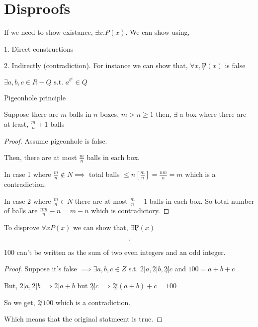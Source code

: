 \section*{Disproofs}

If we need to show existance, $\exists x. P(x)$. We can show using, 

1. Direct constructions

2. Indirectly (contradiction). For instance we can show that, $\forall x, \not P(x)$ is false


\begin{eg}
    $\exists a,b,c \in R - Q \text{ s.t. } a^b^c \in Q$
\end{eg}

\begin{eg}
    Pigeonhole principle

    Suppose there are $m$ balls in $n$ boxes, $m > n \geq 1$ then, $\exists$ a box where there are at least, $\frac{m}{n} + 1$ balls 
\end{eg}

\begin{proof}
    Assume pigeonhole is false.

    Then, there are at most $\frac{m}{n}$ balls in each box.

    In case 1 where $\frac{m}{n} \not \in N \implies$  total balls $\leq n [\frac{m}{n}] = \frac{nm}{n} = m$ which is a contradiction.

    In case 2 where $\frac{m}{n}\in N$ there are at most $\frac{m}{n} - 1$ balls in each box.
    So total number of balls are $\frac{nm}{n} - n = m - n$ which is contradictory.
\end{proof}


To disprove $\forall x P(x)$ we can show that, $\exists \not P(x)$



\[

.\] 
\begin{eg}
    100 can't be written as the sum of two even integers and an odd integer.
\end{eg}
\begin{proof}
    Suppose it's false $\implies \exists a,b,c \in Z$ s.t. $2 | a, 2 | b, 2 \not | c$ and  $100 = a + b + c$

    But,  $2 | a, 2 | b \implies 2 | a + b$ but  $2 \not | c \implies 2 \not | (a + b) + c = 100$

    So we get,  $2 \not | 100$ which is a contradiction.

    Which means that the original statmeent is true.
\end{proof}


